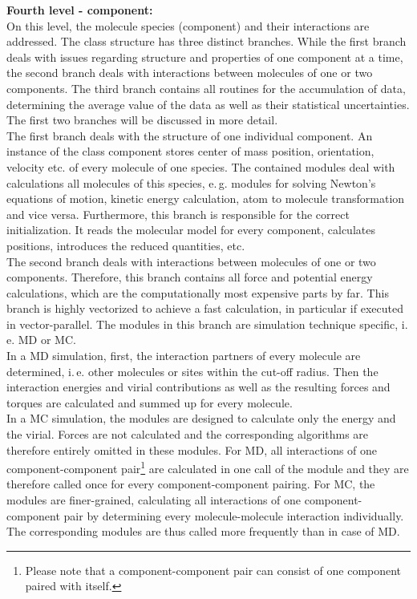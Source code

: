 \textbf{Fourth level - component:}\\
On this level, the molecule species (component) and their interactions are addressed. The class structure has three distinct branches. While the first branch deals with issues regarding structure and properties of one component at a time, the second branch deals with interactions between molecules of one or two components. The third branch contains all routines for the accumulation of data, determining the average value of the data as well as their statistical uncertainties. The first two branches will be discussed in more detail.\\
The first branch deals with the structure of one individual component. An instance of the class component stores center of mass position, orientation, velocity etc. of every molecule of one species. The contained modules deal with calculations all molecules of this species, e.\,g. modules for solving Newton's equations of motion, kinetic energy calculation, atom to molecule transformation and vice versa. Furthermore, this branch is responsible for the correct initialization. It reads the molecular model for every component, calculates positions, introduces the reduced quantities, etc.\\
The second branch deals with interactions between molecules of one or two components. Therefore, this branch contains all force and potential energy calculations, which are the computationally most expensive parts by far. This branch is highly vectorized to achieve a fast calculation, in particular if executed in vector-parallel. The modules in this branch are simulation technique specific, i.\,e. MD or MC. \\
In a MD simulation, first, the interaction partners of every molecule are determined, i.\,e. other molecules or sites within the cut-off radius. Then the interaction energies and virial contributions as well as the resulting forces and torques are calculated and summed up for every molecule. \\  
In a MC simulation, the modules are designed to calculate only the energy and the virial. Forces are not calculated and the corresponding algorithms are therefore entirely omitted in these modules. For MD, all interactions of one component-component pair\footnote{Please note that a component-component pair can consist of one component paired with itself.} are calculated in one call of the module and they are therefore called once for every component-component pairing. For MC, the modules are finer-grained, calculating all interactions of one component-component pair by determining every molecule-molecule interaction individually. The corresponding modules are thus called more frequently than in case of MD.

